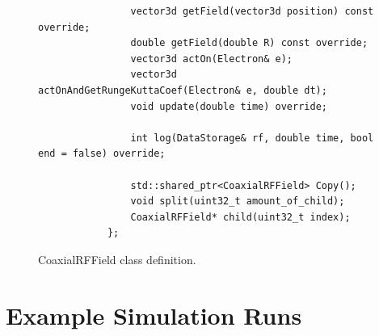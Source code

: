 \documentclass[a4paper,oneside,12pt]{report}
\numberwithin{equation}{chapter}
\begin{document}
\begin{figure}[H]
\begin{minipage}{\textwidth}
\begin{verbatim}
                vector3d getField(vector3d position) const override;
                double getField(double R) const override;
                vector3d actOn(Electron& e);
                vector3d actOnAndGetRungeKuttaCoef(Electron& e, double dt);    
                void update(double time) override; 

                int log(DataStorage& rf, double time, bool end = false) override;

                std::shared_ptr<CoaxialRFField> Copy();
                void split(uint32_t amount_of_child);
                CoaxialRFField* child(uint32_t index);
            };
        \end{verbatim}
    \end{minipage}
    \vspace{20pt}
    \caption{CoaxialRFField class definition.}
    \label{fig:rf_class}
\end{figure}

\chapter{Example Simulation Runs} \label{appendix:example_simulation_runs}
\end{document}
